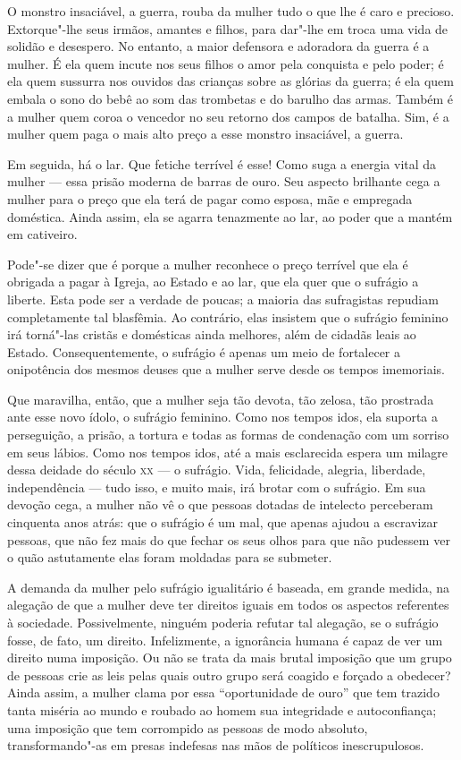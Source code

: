 O monstro insaciável, a guerra, rouba da mulher tudo o que lhe é caro e
precioso. Extorque"-lhe seus irmãos, amantes e filhos, para dar"-lhe em troca
uma vida de solidão e desespero. No entanto, a maior defensora e
adoradora da guerra é a mulher. É ela quem incute nos seus filhos o amor pela conquista e pelo poder; é ela quem sussurra nos ouvidos das crianças sobre as glórias da guerra; é ela quem embala o sono do bebê ao som das
trombetas e do barulho das armas. Também é a mulher quem coroa o vencedor no
seu retorno dos campos de batalha. Sim, é a mulher quem paga o mais alto
preço a esse monstro insaciável, a guerra.

Em seguida, há o lar. Que fetiche terrível é esse! Como suga a energia
vital da mulher --- essa prisão moderna de barras de ouro. Seu aspecto
brilhante cega a mulher para o preço que ela terá de pagar como esposa,
mãe e empregada doméstica. Ainda assim, ela se agarra tenazmente ao lar,
ao poder que a mantém em cativeiro.

Pode"-se dizer que é porque a mulher reconhece o preço terrível que ela é
obrigada a pagar à Igreja, ao Estado e ao lar, que ela quer que o
sufrágio a liberte. Esta pode ser a verdade de poucas; a maioria das
sufragistas repudiam completamente tal blasfêmia. Ao contrário, elas
insistem que o sufrágio feminino irá torná"-las cristãs e domésticas
ainda melhores, além de cidadãs leais ao Estado. Consequentemente, o
sufrágio é apenas um meio de fortalecer a onipotência dos mesmos deuses
que a mulher serve desde os tempos imemoriais.

Que maravilha, então, que a mulher seja tão devota, tão zelosa, tão
prostrada ante esse novo ídolo, o sufrágio feminino. Como nos tempos
idos, ela suporta a perseguição, a prisão, a tortura e todas as formas
de condenação com um sorriso em seus lábios. Como nos tempos idos, até a
mais esclarecida espera um milagre dessa deidade do século \textsc{xx} --- o
sufrágio. Vida, felicidade, alegria, liberdade, independência --- tudo
isso, e muito mais, irá brotar com o sufrágio. Em sua devoção cega, a
mulher não vê o que pessoas dotadas de intelecto perceberam cinquenta
anos atrás: que o sufrágio é um mal, que apenas ajudou a escravizar
pessoas, que não fez mais do que fechar os seus olhos para que não
pudessem ver o quão astutamente elas foram moldadas para se submeter.

A demanda da mulher pelo sufrágio igualitário é baseada, em grande
medida, na alegação de que a mulher deve ter direitos iguais em todos os aspectos referentes à sociedade. Possivelmente, ninguém poderia refutar
tal alegação, se o sufrágio fosse, de fato, um direito. Infelizmente, a
ignorância humana é capaz de ver um direito numa imposição. Ou não se
trata da mais brutal imposição que um grupo de pessoas crie as leis
pelas quais outro grupo será coagido e forçado a obedecer? Ainda assim,
a mulher clama por essa ``oportunidade de ouro'' que tem trazido tanta
miséria ao mundo e roubado ao homem sua integridade e autoconfiança; uma
imposição que tem corrompido as pessoas de modo absoluto,
transformando"-as em presas indefesas nas mãos de políticos
inescrupulosos.

